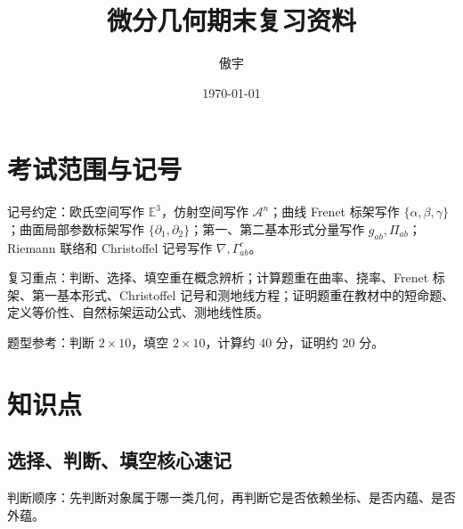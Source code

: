 \documentclass[UTF8,12pt,a4paper]{ctexart}
\title{微分几何期末复习资料}
\author{傲宇}
\date{\today}
\newcommand{\E}{\mathbb E}
\newcommand{\A}{\mathcal A}
\begin{document}
\maketitle
\tableofcontents

\section*{考试范围与记号}
记号约定：欧氏空间写作 $\E^3$，仿射空间写作 $\A^n$；曲线 Frenet 标架写作 $\{\alpha,\beta,\gamma\}$；曲面局部参数标架写作 $\{\partial_1,\partial_2\}$；第一、第二基本形式分量写作 $g_{ab},\Pi_{ab}$；Riemann 联络和 Christoffel 记号写作 $\nabla,\Gamma^c_{ab}$。

复习重点：判断、选择、填空重在概念辨析；计算题重在曲率、挠率、Frenet 标架、第一基本形式、Christoffel 记号和测地线方程；证明题重在教材中的短命题、定义等价性、自然标架运动公式、测地线性质。

题型参考：判断 $2\times 10$，填空 $2\times 10$，计算约 $40$ 分，证明约 $20$ 分。

\newpage

\section{知识点}

\subsection{选择、判断、填空核心速记}
判断顺序：先判断对象属于哪一类几何，再判断它是否依赖坐标、是否内蕴、是否外蕴。
\end{document}
